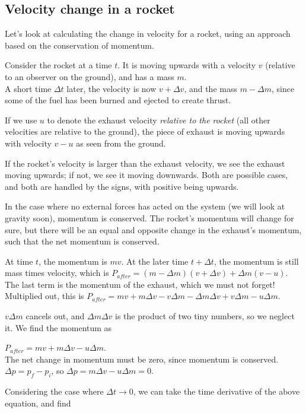 \subsection{Velocity change in a rocket}

Let's look at calculating the change in velocity for a rocket, using an approach based on the conservation of momentum.

Consider the rocket at a time $t$. It is moving upwards with a velocity $v$ (relative to an observer on the ground), and has a mass $m$.\\
A short time $\Delta t$ later, the velocity is now $v + \Delta v$, and the mass $m - \Delta m$, since some of the fuel has been burned and ejected to create thrust.

If we use $u$ to denote the exhaust velocity \emph{relative to the rocket} (all other velocities are relative to the ground), the piece of exhaust is moving upwards with velocity $v - u$ as seen from the ground.

If the rocket's velocity is larger than the exhaust velocity, we see the exhaust moving upwards; if not, we see it moving downwards. Both are possible cases, and both are handled by the signs, with positive being upwards.

In the case where no external forces has acted on the system (we will look at gravity soon), momentum is conserved. The rocket's momentum will change for sure, but there will be an equal and opposite change in the exhaust's momentum, such that the net momentum is conserved.

At time $t$, the momentum is $m v$. At the later time $t + \Delta t$, the momentum is still mass times velocity, which is $P_{after} = (m - \Delta m)(v + \Delta v) + \Delta m(v - u)$. The last term is the momentum of the exhaust, which we must not forget!\\
Multiplied out, this is $P_{after} = m v + m \Delta v - v \Delta m - \Delta m \Delta v + v \Delta m - u \Delta m$. 

$v \Delta m$ cancels out, and $\Delta m \Delta v$ is the product of two tiny numbers, so we neglect it. We find the momentum as

$P_{after} = m v + m \Delta v - u \Delta m$.\\
The net change in momentum must be zero, since momentum is conserved. $\Delta p = p_f - p_i$, so $\Delta p = m \Delta v - u \Delta m = 0$.

Considering the case where $\Delta t \to 0$, we can take the time derivative of the above equation, and find

